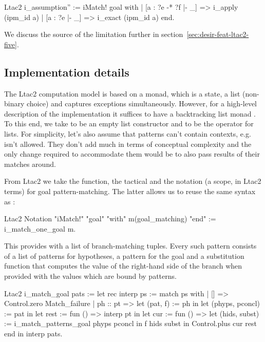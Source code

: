 \begin{itemize}
\begin{minipage}{\linewidth}
\begin{coq}
Ltac2 i_assumption'' :=
  iMatch! goal with
  | [a : ?e -* ?f |- _] => i_apply (ipm_id a)
  | [a : ?e |- _] => i_exact (ipm_id a)
  end.
\end{coq}
\end{minipage}

We discuss the source of the limitation further in section~\ref{sec:desir-feat-ltac2-five}.
\end{itemize}

\subsection{Implementation details}
\label{subsec:implementation_details}

The Ltac2 computation model is based on a monad, which is a state, a list (non-binary choice) and captures exceptions simultaneously.
However, for a high-level description of the implementation it suffices to have a backtracking list monad .
To this end, we take  to be an empty list constructor
and  to be the  operator for lists.
For simplicity, let's also assume that patterns can't contain contexts, e.g.  isn't allowed.
They don't add much in terms of conceptual complexity and the only change required to accommodate them would be to also pass results of their matches around.

From Ltac2 we take the  function, the  tactical and the notation (a scope, in Ltac2 terms) for goal pattern-matching.
The latter allows us to reuse the same syntax as :
\begin{coq}
Ltac2 Notation "iMatch!" "goal" "with" m(goal_matching) "end" :=
  i_match_one_goal m.
\end{coq}
This provides  with a list of branch-matching tuples.
Every such pattern consists of a list of patterns for hypotheses, a pattern for the goal and a substitution function that computes the value of the right-hand side of the branch when provided with the values which are bound by patterns.

\begin{coq}
Ltac2 i_match_goal pats :=
  let rec interp ps := match ps with
  | [] => Control.zero Match_failure
  | ph :: pt =>
    let (pat, f) := ph in
    let (phyps, pconcl) := pat in
    let rest := fun () => interp pt in
    let cur := fun () =>
      let (hids, subst) := i_match_patterns_goal phyps pconcl in
      f hids subst
    in Control.plus cur rest
  end in
  interp pats.
\end{coq}

